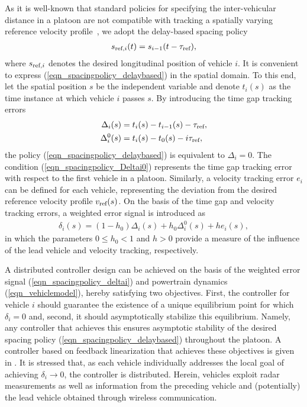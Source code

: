 \documentclass[journal]{IEEEtran}
\newcommand{\dtref}{\ensuremath{\tau_{\text{\rm ref}}}}
\newcommand{\vref}{\ensuremath{v_{\text{\rm ref}}}}
\begin{document}
As it is well-known that standard policies for specifying the inter-vehicular distance in a platoon are not compatible with tracking a spatially varying reference velocity profile~\cite{alam_2013,besselink_2015b}, we adopt the delay-based spacing policy
\begin{align}
s_{\text{\rm ref},i}(t) = s_{i-1}(t-\dtref),
\label{eqn_spacingpolicy_delaybased}
\end{align}
where $s_{\text{\rm ref},i}$ denotes the desired longitudinal position of vehicle $i$. It is convenient to express (\ref{eqn_spacingpolicy_delaybased}) in the spatial domain. To this end, let the spatial position $s$ be the independent variable and denote $t_i(s)$ as the time instance at which vehicle $i$ passes $s$. By introducing the time gap tracking errors
\begin{align}
\Delta_i(s) &= t_i(s) - t_{i-1}(s) - \dtref, \label{eqn_spacingpolicy_Deltai}\\
\Delta_i^0(s) &= t_i(s) - t_0(s) - i\dtref, \label{eqn_spacingpolicy_Deltai0}
\end{align}
the policy (\ref{eqn_spacingpolicy_delaybased}) is equivalent to $\Delta_i = 0$. The condition (\ref{eqn_spacingpolicy_Deltai0}) represents the time gap tracking error with respect to the first vehicle in a platoon. Similarly, a velocity tracking error $e_i$ can be defined for each vehicle, representing the deviation from the desired reference velocity profile $\vref(s)$. On the basis of the time gap and velocity tracking errors, a weighted error signal is introduced as
\begin{align}
\delta_i(s) = (1-h_0)\Delta_i(s) + h_0\Delta_i^0(s) + he_i(s),
\label{eqn_spacingpolicy_deltai}
\end{align}
in which the parameters $0\leq h_0 < 1$ and $h>0$ provide a measure of the influence of the lead vehicle and velocity tracking, respectively.

A distributed controller design can be achieved on the basis of the weighted error signal (\ref{eqn_spacingpolicy_deltai}) and powertrain dynamics (\ref{eqn_vehiclemodel}), hereby satisfying two objectives. First, the controller for vehicle $i$ should guarantee the existence of a unique equilibrium point for which $\delta_i = 0$ and, second, it should asymptotically stabilize this equilibrium. Namely, any controller that achieves this ensures asymptotic stability of the desired spacing policy (\ref{eqn_spacingpolicy_delaybased}) throughout the platoon. A controller based on feedback linearization that achieves these objectives is given in \cite{besselink_2015b}. It is stressed that, as each vehicle individually addresses the local goal of achieving $\delta_i\rightarrow0$, the controller is distributed. Herein, vehicles exploit radar measurements as well as information from the preceding vehicle and (potentially) the lead vehicle obtained through wireless communication.
\end{document}
